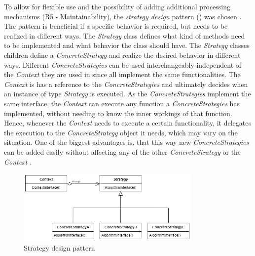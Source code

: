 To allow for flexible use and the possibility of adding additional processing mechanisms (R5 - Maintainability), the \textit{strategy design} pattern () was chosen \cite{gamma1994design}.
The pattern is beneficial if a specific behavior is required, but needs to be realized in different ways.
The \textit{Strategy} class defines what kind of methods need to be implemented and what behavior the class should have.
The \textit{Strategy} classes children define a \textit{ConcreteStrategy} and realize the desired behavior in different ways.
Different \textit{ConcreteStrategies} can be used interchangeably independent of the \textit{Context} they are used in since all implement the same functionalities.
The \textit{Context} is has a reference to the \textit{ConcreteStrategies} and ultimately decides when an instance of type \textit{Strategy} is executed.
As the \textit{ConcreteStrategies} implement the same interface, the \textit{Context} can execute any function a \textit{ConcreteStrategies} has implemented, without needing to know the inner workings of that function.
Hence, whenever the \textit{Context} needs to execute a certain functionality, it delegates the execution to the \textit{ConcreteStrategy} object it needs, which may vary on the situation.
One of the biggest advantages is, that this way new \textit{ConcreteStrategies} can be added easily without affecting any of the other \textit{ConcreteStrategy} or the \textit{Context} \cite{gamma1994design}.

\begin{figure}[h]
	\centering
	\includegraphics[width=0.8\textwidth]{images/strategy.png}
	\caption[Strategy Design Pattern]{Strategy design pattern \cite[p. 316]{gamma1994design}}
	\label{fig:design}
\end{figure}

